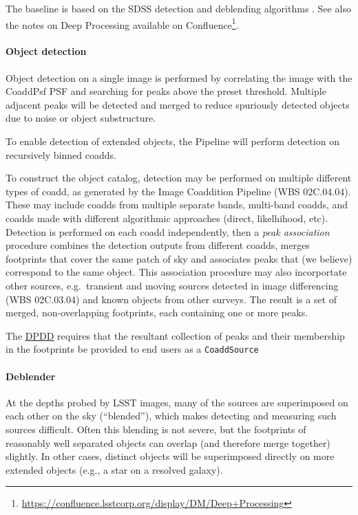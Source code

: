 \documentclass[12pt]{article}
\newcommand{\ds}[2]{{\color{blue} \href{https://docushare.lsstcorp.org/docushare/dsweb/Get/#1}{#2}}\xspace}
\newcommand{\DPDD}{\ds{LSE-163}{DPDD}}
\newcommand{\wbsDiffim}{WBS 02C.03.04}
\newcommand{\wbsCoadd}{WBS 02C.04.04}
\begin{document}
The baseline is based on the SDSS detection and deblending algorithms \cite{LuptonPhoto, Lupton05}. See also the notes on Deep Processing available on Confluence\footnote{\url{https://confluence.lsstcorp.org/display/DM/Deep+Processing}}.

\paragraph{Object detection}

Object detection on a single image is performed by correlating the image with the
CoaddPsf PSF and searching for peaks above the preset threshold. Multiple
adjacent peaks will be detected and merged to reduce spuriously detected
objects due to noise or object substructure.

To enable detection of extended objects, the Pipeline will perform detection on
recursively binned coadds.

To construct the object catalog, detection may be performed on multiple different types of coadd, as generated by the Image Coaddition Pipeline (\wbsCoadd{}). These may include coadds from multiple separate bands, multi-band coadds, and coadds made with different algorithmic approaches (direct, likelhihood, etc). Detection is performed on each coadd independently, then a \textit{peak association} procedure combines the detection outputs from different coadds, merges footprints that cover the same patch of sky and associates peaks that (we believe) correspond to the same object. This association procedure may also incorportate other sources, e.g.\ transient and moving sources detected in image differencing (\wbsDiffim{}) and known objects from other surveys. The result is a set of merged, non-overlapping footprints, each containing one or more peaks.

The \DPDD{} requires that the resultant collection of peaks and their
membership in the footprints be provided to end users as a \texttt{CoaddSource}

\paragraph{Deblender}
\label{alg:deblender}

At the depths probed by LSST images, many of the sources are superimposed on each other on the sky (``blended''), which makes detecting and measuring such sources difficult.  Often this blending is not severe, but the footprints of reasonably well separated objects can overlap (and therefore merge together) slightly.  In other cases, distinct objects will be superimposed directly on more extended objects (e.g., a star on a resolved galaxy). %
\end{document}
